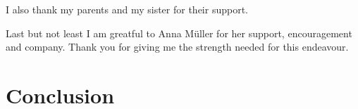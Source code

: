 \documentclass[12pt,toc=bibnumbered, a4paper,twoside,DIV=calc]{scrbook}
\begin{document}
I also thank my parents and my sister for their support.

Last but not least I am greatful to Anna M\"uller for her support,
encouragement and company. Thank you for giving me the strength needed for this
endeavour.




%













\chapter{Conclusion}



\end{document}
